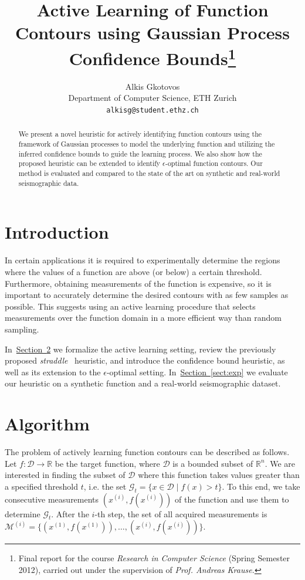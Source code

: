 \documentclass[11pt]{article} %
\title{Active Learning of Function Contours using Gaussian Process Confidence Bounds\thanks{Final
report for the course \emph{Research in Computer Science} (Spring
Semester 2012), carried out under the supervision of \emph{Prof. Andreas Krause.}}}
\author{
Alkis Gkotovos\\
Department of Computer Science, ETH Zurich\\
\texttt{alkisg@student.ethz.ch}
}
\newcommand{\sectref}[1]{\hyperref[#1]{\mbox{Section~\ref*{#1}}}}
\begin{document}
\maketitle

\begin{abstract}
We present a novel heuristic for actively identifying function
contours using the framework of Gaussian processes to model the underlying
function and utilizing the
inferred confidence bounds to guide the learning process. We also show how
the proposed heuristic can be extended to identify $\epsilon$-optimal function
contours. Our method is evaluated and compared to the state of the art on
synthetic and real-world seismographic data.
\end{abstract}

\section{Introduction}
In certain applications it is required to experimentally determine the regions
where the values of a function are above (or below) a certain threshold.
Furthermore, obtaining measurements of the function is expensive, so it is
important to
accurately determine the desired contours with as few samples as possible.
This suggests using an active learning procedure that selects measurements
over the function domain in a more efficient way than random sampling.

In~\sectref{sect:algo} we formalize the active learning setting,
review the previously proposed \emph{straddle}~\cite{bryan2005} heuristic,
and introduce the confidence bound heuristic, as well as its extension
to the $\epsilon$-optimal setting. In~\sectref{sect:exp} we
evaluate our heuristic on a synthetic function and a real-world seismographic
dataset.

\section{Algorithm} \label{sect:algo}
The problem of actively learning function contours can be described as follows.
Let ${f : \mathcal{D} \to \mathbb{R}}$ be the target function, where
$\mathcal{D}$ is a bounded subset of $\mathbb{R}^n$. We are interested in
finding the subset of $\mathcal{D}$ where this function takes values greater
than a specified threshold $t$, i.e. the set
$\mathcal{G}_t = \{x \in \mathcal{D} \mid f(x) > t\}$. To this end, we take
consecutive measurements $(x^{(i)}, f(x^{(i)}))$ of the function
and use them to determine $\mathcal{G}_t$. After the $i$-th step, the set of
all acquired measurements is
$\mathcal{M}^{(i)} = \{(x^{(1)}, f(x^{(1)})),\ldots,(x^{(i)}, f(x^{(i)}))\}$.
\end{document}
